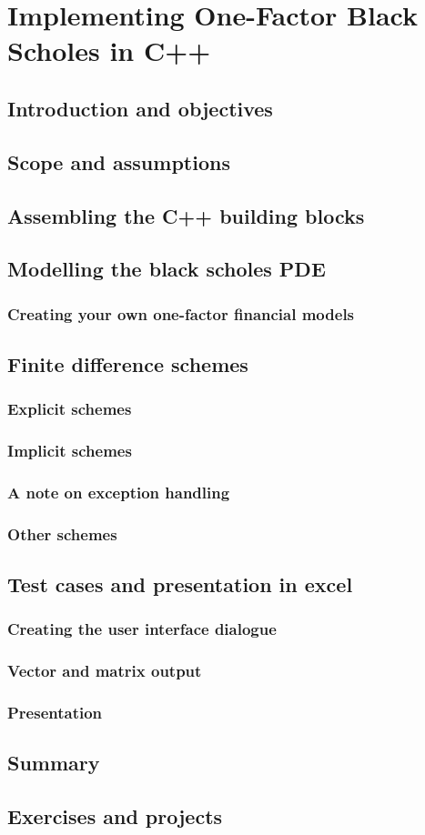 \chapter{Implementing One-Factor Black Scholes in C++}

\section{Introduction and objectives}
\section{Scope and assumptions}
\section{Assembling the C++ building blocks}
\section{Modelling the black scholes PDE}

\subsection{Creating your own one-factor financial models}

\section{Finite difference schemes}

\subsection{Explicit schemes}
\subsection{Implicit schemes}
\subsection{A note on exception handling}
\subsection{Other schemes}

\section{Test cases and presentation in excel}

\subsection{Creating the user interface dialogue}
\subsection{Vector and matrix output}
\subsection{Presentation}

\section{Summary}
\section{Exercises and projects}